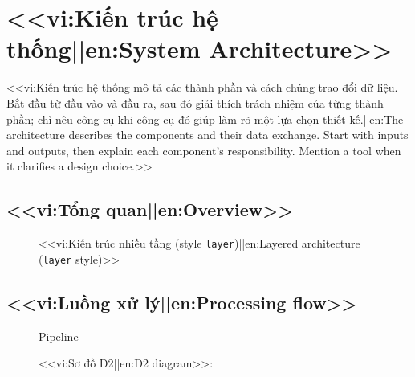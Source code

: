 \chapter{<<vi:Kiến trúc hệ thống||en:System Architecture>>}
\label{ch:arch}
<<vi:Kiến trúc hệ thống mô tả các thành phần và cách chúng trao đổi dữ liệu. Bắt đầu từ đầu vào và đầu ra, sau đó giải thích trách nhiệm của từng thành phần; chỉ nêu công cụ khi công cụ đó giúp làm rõ một lựa chọn thiết kế.||en:The architecture describes the components and their data exchange. Start with inputs and outputs, then explain each component’s responsibility. Mention a tool when it clarifies a design choice.>>

\section{<<vi:Tổng quan||en:Overview>>}
\begin{figure}[htbp]
  \centering
  \caption{<<vi:Kiến trúc nhiều tầng (style \texttt{layer})||en:Layered architecture (\texttt{layer} style)>>}
  \label{fig:layers}
\end{figure}

\section{<<vi:Luồng xử lý||en:Processing flow>>}
\begin{figure}[htbp]
  \centering
  \caption{Pipeline}
\end{figure}

\begin{figure}[htbp]
  \centering
  \caption{<<vi:Sơ đồ D2||en:D2 diagram>>: }
\end{figure}
